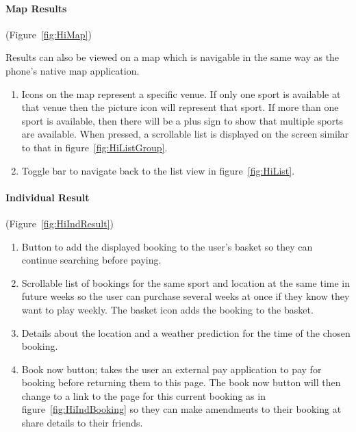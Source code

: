\paragraph{Map Results}

(Figure~\ref{fig:HiMap})


Results can also be viewed on a map which is navigable in the same
way as the phone's native map application.
\begin{enumerate}
	\item Icons on the map represent a specific venue. If only one sport is
		available at that venue then the picture icon will represent that
		sport. If more than one sport is available, then there will be a plus
		sign to show that multiple sports are available. When pressed, a
		scrollable list is displayed on the screen similar to that in
		figure~\ref{fig:HiListGroup}.
	\item Toggle bar to navigate back to the list view in
		figure~\ref{fig:HiList}.
\end{enumerate}

\paragraph{Individual Result}

(Figure~\ref{fig:HiIndResult})

\begin{enumerate}
	\item Button to add the displayed booking to the user's basket so they can
		continue searching before paying.
	\item Scrollable list of bookings for the same sport and location at the
		same time in future weeks so the user can purchase several weeks at
		once if they know they want to play weekly. The basket icon adds the
		booking to the basket.
	\item Details about the location and a weather prediction for the time of
		the chosen booking.
	\item Book now button; takes the user an external pay application to pay
		for booking before returning them to this page. The book now button
		will then change to a link to the page for this current booking as
		in figure~\ref{fig:HiIndBooking} so they can make amendments to their
		booking at share details to their friends.
\end{enumerate}
